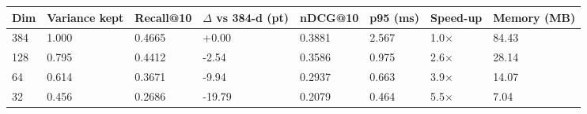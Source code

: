 \begin{tabular}{llllllll}
\hline
Dim & Variance kept & Recall@10 & $\Delta$ vs 384-d (pt) & nDCG@10 & p95 (ms) & Speed-up & Memory (MB) \\
\hline
384 & 1.000 & 0.4665 & +0.00 & 0.3881 & 2.567 & 1.0$\times$ & 84.43 \\
128 & 0.795 & 0.4412 & -2.54 & 0.3586 & 0.975 & 2.6$\times$ & 28.14 \\
64 & 0.614 & 0.3671 & -9.94 & 0.2937 & 0.663 & 3.9$\times$ & 14.07 \\
32 & 0.456 & 0.2686 & -19.79 & 0.2079 & 0.464 & 5.5$\times$ & 7.04 \\
\hline
\end{tabular}
